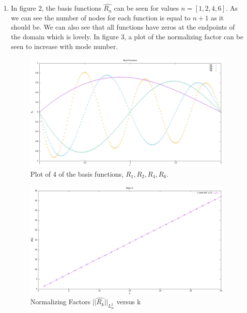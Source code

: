 \documentclass{article}
\begin{document}
\begin{enumerate}[label=\alph*)]
    \item In figure 2, the basis functions $\hat{R_n}$ can be seen for values $n
    = [1,2,4,6]$. As we can see the number of nodes for each function is equal
    to $n + 1$ as it should be. We can also see that all functions have zeros at
    the endpoints of the domain which is lovely. In figure 3, a plot of the
    normalizing factor can be seen to increase with mode number. 
    \begin{figure}[ht]
        \centering
        \includegraphics[width=.8\textwidth]{r.png}
        \caption{Plot of 4 of the basis functions, $R_1, R_2, R_4, R_6$.}
    \end{figure}
    \begin{figure}[ht]
        \centering
        \includegraphics[width=.8\textwidth]{r_norm.png}
        \caption{Normalizing Factors $||\hat{R_k}||_{L_w^2}$ versus k}
    \end{figure}

\end{enumerate}
\end{document}
